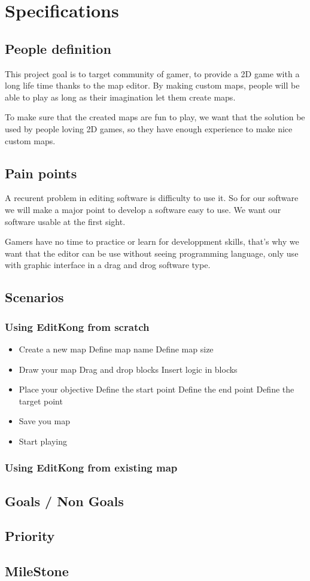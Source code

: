 \newpage
\thispagestyle{empty}

\chapter{Specifications}

\section{People definition}

This project goal is to target community of gamer, to provide a 2D game with a long life time thanks to the map editor. By making custom maps, people will be able to play as long as their imagination let them create maps.

To make sure that the created maps are fun to play, we want that the solution be used by people loving 2D games, so they have enough experience to make nice custom maps.

\section{Pain points}

A recurent problem in editing software is difficulty to use it. So for our software we will make a major point to develop a software easy to use. We want our software usable at the first sight.

Gamers have no time to practice or learn for developpment skills, that's why we want that the editor can be use without seeing programming language, only use with graphic interface in a drag and drog software type.

\newpage
\section{Scenarios}

\subsection{Using EditKong from scratch}

\begin{itemize}
\item Create a new map
\subitem Define map name 
\subitem Define map size
\item Draw your map
\subitem Drag and drop blocks
\subitem Insert logic in blocks
\item Place your objective
\subitem Define the start point
\subitem Define the end point
\subitem Define the target point
\item Save you map
\item Start playing
\end{itemize}

\subsection{Using EditKong from existing map}

\section{Goals / Non Goals}
\section{Priority}
\section{MileStone}
